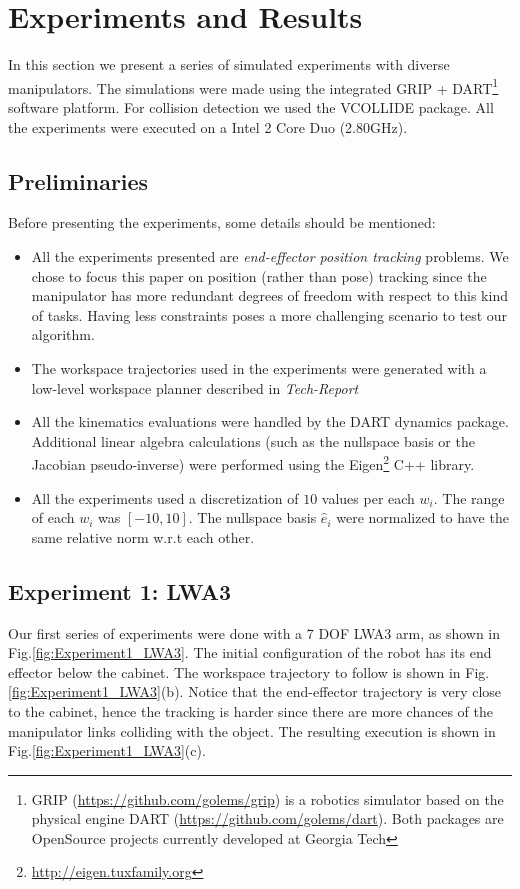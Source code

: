 \documentclass[conference]{IEEEtran}
\newcommand{\nsb}{\ensuremath{\hat{e}}} %
\newcommand{\nsc}{\ensuremath{w}}  %
\begin{document}
\section{Experiments and Results}
\label{sec:Experiments}
In this section we present a series of simulated experiments
with diverse manipulators. The simulations were made using the
integrated GRIP + DART\footnote{ GRIP (\url{https://github.com/golems/grip})
is a robotics simulator based on the physical engine DART (\url{https://github.com/golems/dart}).
Both packages are OpenSource projects currently developed at Georgia Tech} 
software platform. For collision detection we used the VCOLLIDE package\cite{Hudson97v-collide:accelerated}. All the experiments were
executed on a Intel 2 Core Duo (2.80GHz).

\subsection{Preliminaries}
Before presenting the experiments, some details should be mentioned:

\begin{itemize}
\item{All the experiments presented are \textit{end-effector position
tracking} problems. We chose to focus this paper on
position (rather than pose) tracking since the manipulator
has more redundant degrees of freedom with respect to
this kind of tasks. Having less constraints poses a more
challenging scenario to test our algorithm.}
\item{The workspace trajectories used in the experiments were generated
with a low-level workspace planner described in \textit{Tech-Report}}
\item{All the kinematics evaluations were handled by the DART dynamics package. Additional linear algebra calculations (such as the nullspace basis or the Jacobian pseudo-inverse) were performed using the Eigen\footnote{\url{http://eigen.tuxfamily.org}} C++ library.}
\item{All the experiments used a discretization of $10$ values per each $\nsc_{i}$. The range of each $\nsc_{i}$ was $[-10,10]$. The nullspace basis $\nsb_{i}$ were normalized to have the same relative norm w.r.t each other.}
\end{itemize}

\subsection{Experiment 1: LWA3}
Our first series of experiments were done with a 7 DOF
LWA3 arm, as shown in Fig.\ref{fig:Experiment1_LWA3}. The initial configuration of the
robot has its end effector below the cabinet. The workspace
trajectory to follow is shown in Fig.\ref{fig:Experiment1_LWA3}(b). Notice that the
end-effector trajectory is very close to the cabinet, hence the
tracking is harder since there are more chances of the manipulator
links colliding with the object. The resulting execution is
shown in Fig.\ref{fig:Experiment1_LWA3}(c).
\end{document}
